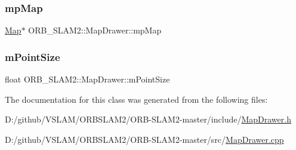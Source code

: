 \subsubsection{\texorpdfstring{mp\+Map}{mpMap}}
{\footnotesize\ttfamily \mbox{\hyperlink{class_o_r_b___s_l_a_m2_1_1_map}{Map}}$\ast$ O\+R\+B\+\_\+\+S\+L\+A\+M2\+::\+Map\+Drawer\+::mp\+Map}

\mbox{\label{class_o_r_b___s_l_a_m2_1_1_map_drawer_ad98a7d7b4aaee890a41696bef0786b84}} 
\subsubsection{\texorpdfstring{m\+Point\+Size}{mPointSize}}
{\footnotesize\ttfamily float O\+R\+B\+\_\+\+S\+L\+A\+M2\+::\+Map\+Drawer\+::m\+Point\+Size\hspace{0.3cm}{\ttfamily [private]}}



The documentation for this class was generated from the following files\+:\begin{DoxyCompactItemize}
\item 
D\+:/github/\+V\+S\+L\+A\+M/\+O\+R\+B\+S\+L\+A\+M2/\+O\+R\+B-\/\+S\+L\+A\+M2-\/master/include/\mbox{\hyperlink{_map_drawer_8h}{Map\+Drawer.\+h}}\item 
D\+:/github/\+V\+S\+L\+A\+M/\+O\+R\+B\+S\+L\+A\+M2/\+O\+R\+B-\/\+S\+L\+A\+M2-\/master/src/\mbox{\hyperlink{_map_drawer_8cpp}{Map\+Drawer.\+cpp}}\end{DoxyCompactItemize}

